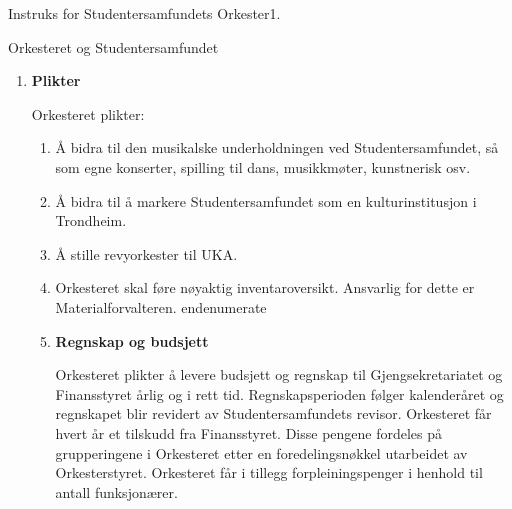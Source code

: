 \begin{instruks}{Instruks for Studentersamfundets Orkester}{1. }{ }
\begin{instruksledd}{Orkesteret og Studentersamfundet}
\begin{enumerate}
                Orkesteret disponerer Musikerlåfte' under forutsetning av at instruksen for bruk av Musikerlåfte'
                blir fulgt.

                Studentersamfundet bevilger hvert år tilskudd til Orkesterets drift og kan bevilge midler til
                Orkesterets
                investeringer. Orkesteret og de faste gruppene kan også søke om ekstrabevilgninger fra Finansstyret
                for
                spesielle utgiftsposter. Orkesteret får utbetalt eventuelle godtgjørelser for utførte tjenester i
                Huset etter avtale
                i hvert enkelt tilfelle.

                Orkesteret kan etter avtale med Kontrollkontoret legge beslag på lokaler i Huset når dette er
                nødvendig for
                Orkesterets arbeid. Arbeidet skal utføres på en slik måte at det, så fremt det er mulig, ikke er til
                ulempe for
                annen utleie eller andre tilstelninger på Huset.

                Medlemmene av Orkesterstyret som har både tale- og stemmerett er funksjonærer ved Studentersamfundet
                i
                Trondhjem.

            \item \textbf{Plikter}

                Orkesteret plikter:

                \begin{enumerate}
                    \item Å bidra til den musikalske underholdningen ved Studentersamfundet, så som egne
                        konserter, spilling til
                        dans, musikkmøter, kunstnerisk osv.
                    \item Å bidra til å markere Studentersamfundet som en kulturinstitusjon i Trondheim.
                    \item Å stille revyorkester til UKA.
                    \item Orkesteret skal føre nøyaktig inventaroversikt. Ansvarlig for dette er
                        Materialforvalteren.
                        end{enumerate}

                    \item \textbf{Regnskap og budsjett}

                        Orkesteret plikter å levere budsjett og regnskap til Gjengsekretariatet og Finansstyret årlig og i
                        rett tid.
                        Regnskapsperioden følger kalenderåret og regnskapet blir revidert av Studentersamfundets revisor.
                        Orkesteret får hvert år et tilskudd fra Finansstyret. Disse pengene fordeles på grupperingene i
                        Orkesteret etter
                        en foredelingsnøkkel utarbeidet av Orkesterstyret. Orkesteret får i tillegg forpleiningspenger i
                        henhold til
                        antall funksjonærer.


\end{enumerate}
\end{enumerate}
\end{instruksledd}
\end{instruks}
